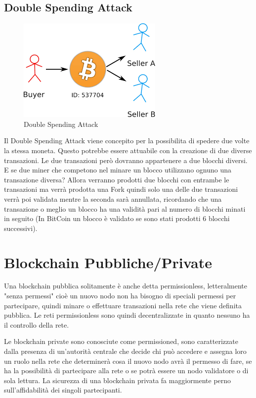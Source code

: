 \documentclass[11pt,a4paper,titlepage,twoside,openright]{report}
\begin{document}
\subsection{Double Spending Attack}
\begin{figure}[h]
	\includegraphics[height=0.2\textheight]{dsa}
	\centering
	\caption{Double Spending Attack}
	\label{fig:ds-attack}
\end{figure}
Il Double Spending Attack viene concepito per la possibilita di spedere due volte la stessa moneta. Questo potrebbe essere attuabile con la creazione di due diverse transazioni. Le due transazioni però dovranno appartenere a due blocchi diversi. E se due miner che competono nel minare un blocco utilizzano ognuno una transazione diversa? Allora verranno prodotti due blocchi con entrambe le transazioni ma verrà prodotta una Fork quindi solo una delle due transazioni verrà poi validata mentre la seconda sarà annullata, ricordando che una transazione o meglio un blocco ha una validità pari al numero di blocchi minati in seguito (In BitCoin un blocco è validato se sono stati prodotti 6 blocchi successivi).

\section{Blockchain Pubbliche/Private}
Una blockchain pubblica solitamente è anche detta permissionless, letteralmente "senza permessi" cioè un nuovo nodo non ha bisogno di speciali permessi per partecipare, quindi minare o effettuare transazioni nella rete che viene definita pubblica. Le reti permissionless sono quindi decentralizzate in quanto nessuno ha il controllo della rete.

Le blockchain private sono conosciute come permissioned, sono caratterizzate dalla presenza di un’autorità centrale che decide chi può accedere e assegna loro un ruolo nella rete che determinerà cosa il nuovo nodo avrà il permesso di fare, se ha la possibilità di partecipare alla rete o se potrà essere un nodo validatore o di sola lettura. La sicurezza di una blockchain privata fa maggiormente perno sull'affidabilità dei singoli partecipanti.
\end{document}
